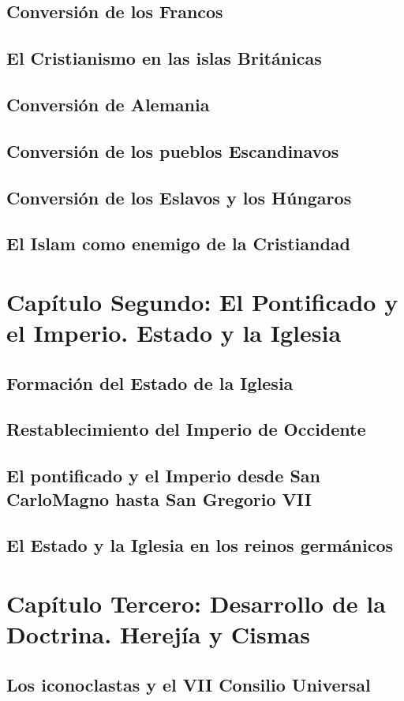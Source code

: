 \raggedbottom{} \documentclass[12pt, a4paper]{book}
\begin{document}
\section{Conversión de los Francos}
\section{El Cristianismo en las islas Británicas}
\section{Conversión de Alemania}
\section{Conversión de los pueblos Escandinavos}
\section{Conversión de los Eslavos y los Húngaros}
\section{El Islam como enemigo de la Cristiandad}
\chapter{Capítulo Segundo: El Pontificado y el Imperio. Estado y la Iglesia}
\section{Formación del Estado de la Iglesia}
\section{Restablecimiento del Imperio de Occidente}
\section{El pontificado y el Imperio desde San CarloMagno hasta San Gregorio VII}
\section{El Estado y la Iglesia en los reinos germánicos}
\chapter{Capítulo Tercero: Desarrollo de la Doctrina. Herejía y Cismas}
\section{Los iconoclastas y el VII Consilio Universal}
\end{document}
